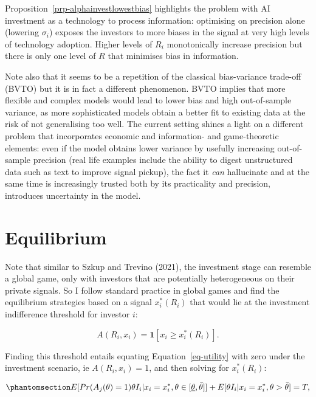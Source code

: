 \documentclass[
]{article}
\theoremstyle{definition}
\theoremstyle{plain}
\theoremstyle{remark}
\begin{document}
Proposition~\ref{prp-alphainvestlowestbias} highlights the problem with
AI investment as a technology to process information: optimising on
precision alone (lowering \(\sigma_i\)) exposes the investors to more
biases in the signal at very high levels of technology adoption. Higher
levels of \(R_i\) monotonically increase precision but there is only one
level of \(R\) that minimises bias in information.

Note also that it seems to be a repetition of the classical
bias-variance trade-off (BVTO) but it is in fact a different phenomenon.
BVTO implies that more flexible and complex models would lead to lower
bias and high out-of-sample variance, as more sophisticated models
obtain a better fit to existing data at the risk of not generalising too
well. The current setting shines a light on a different problem that
incorporates economic and information- and game-theoretic elements: even
if the model obtains lower variance by usefully increasing out-of-sample
precision (real life examples include the ability to digest unstructured
data such as text to improve signal pickup), the fact it \emph{can}
hallucinate and at the same time is increasingly trusted both by its
practicality and precision, introduces uncertainty in the model.

\section{Equilibrium}\label{equilibrium}

Note that similar to Szkup and Trevino (2021), the investment stage can
resemble a global game, only with investors that are potentially
heterogeneous on their private signals. So I follow standard practice in
global games and find the equilibrium strategies based on a signal
\(x_i^*(R_i)\) that would lie at the investment indifference threshold
for investor \(i\):

\[
A(R_i, x_i) = \mathbf{1}[x_i \geq x_i^*(R_i)].
\]

Finding this threshold entails equating Equation~\ref{eq-utility} with
zero under the investment scenario, ie \(A(R_i, x_i)=1\), and then
solving for \(x_i^*(R_i)\):

\begin{equation}\phantomsection\label{eq-equilinvest}{
E[Pr(A_j(\theta)=1)\theta I_i | x_i = x_i^*, \theta \in [\underline{\theta}, \bar{\theta}] ] + E[\theta I_i |x_i = x_i^*, \theta > \bar{\theta} ] = T,
}\end{equation}
\end{document}
